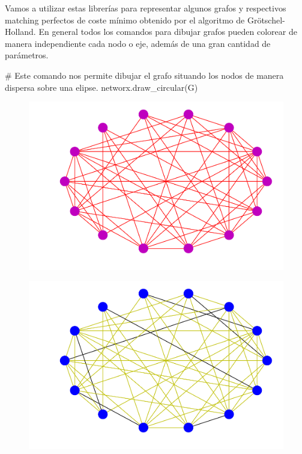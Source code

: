 \documentclass[twoside,a4paper,openright,12pt,tikz]{book}
\begin{document}
Vamos a utilizar estas librerías para representar algunos grafos y respectivos matching perfectos de coste mínimo obtenido por el algoritmo de Grötschel-Holland. En general todos los comandos para dibujar grafos pueden colorear de manera independiente cada nodo o eje, además de una gran cantidad de parámetros. 
\begin{pythone}
# Este comando nos permite dibujar el grafo situando los nodos de manera dispersa sobre una elipse.
networx.draw_circular(G)
\end{pythone}



\begin{figure}[h!]
\centering
\includegraphics[scale=0.45]{foo}
\caption{}
\end{figure}

\begin{figure}[h!]
\centering
\includegraphics[scale=0.45]{foo1}
\caption{}
\end{figure}
\end{document}
